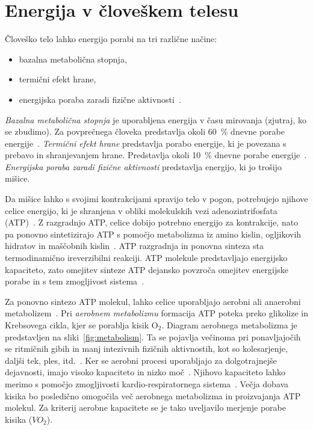 \section{Energija v človeškem telesu}\label{sec:energija}
Človeško telo lahko energijo porabi na tri različne načine:

\begin{itemize}
\item bazalna metabolična stopnja,
\item termični efekt hrane,
\item energijska poraba zaradi fizične aktivnosti~\cite{levine2005measurement}.
\end{itemize}

\emph{Bazalna metabolična stopnja} je uporabljena energija v času mirovanja (zjutraj, ko se zbudimo). Za povprečnega človeka predstavlja okoli \SI{60}{\%} dnevne porabe energije~\cite{levine2005measurement}. \emph{Termični efekt hrane} predstavlja porabo energije, ki je povezana s prebavo in shranjevanjem hrane. Predstavlja okoli \SI{10}{\%} dnevne porabe energije~\cite{levine2005measurement}. \emph{Energijska poraba zaradi fizične aktivnosti} predstavlja energijo, ki jo trošijo mišice. 

Da mišice lahko s svojimi kontrakcijami spravijo telo v pogon, potrebujejo njihove celice energijo, ki je shranjena v obliki molekulskih vezi adenozintrifosfata (ATP)~\cite{scott2005misconceptions}. Z razgradnjo ATP, celice dobijo potrebno energijo za kontrakcije, nato pa ponovno sintetizirajo ATP s pomočjo metabolizma iz amino kislin, ogljikovih hidratov in maščobnih kislin~\cite{scott2005misconceptions,patel2017aerobic}. ATP razgradnja in ponovna sinteza sta termodinamično ireverzibilni reakciji.%
ATP molekule predstavljajo energijsko kapaciteto, zato omejitev sinteze ATP dejansko povzroča omejitev energijske porabe in s tem zmogljivost sistema~\cite{sahlin1998energy}.

Za ponovno sintezo ATP molekul, lahko celice uporabljajo aerobni ali anaerobni metabolizem~\cite{scott2005misconceptions}. Pri \emph{aerobnem metabolizmu} formacija ATP poteka preko glikolize in Krebsovega cikla, kjer se porablja kisik $\mathrm{O}_2$. Diagram aerobnega metabolizma je predstavljen na sliki~\ref{fig:metabolism}. Ta se pojavlja večinoma pri ponavljajočih se ritmičnih gibih in manj intezivnih fizičnih aktivnostih, kot so kolesarjenje, daljši tek, ples, itd.~\cite{patel2017aerobic}. Ker se aerobni procesi uporabljajo za dolgotrajnejše dejavnosti, imajo visoko kapaciteto in nizko moč~\cite{sahlin1998energy}. Njihovo kapaciteto lahko merimo s pomočjo zmogljivosti kardio-respiratornega sistema~\cite{patel2017aerobic}. Večja dobava kisika bo posledično omogočila več aerobnega metabolizma in proizvajanja ATP molekul. Za kriterij aerobne kapacitete se je tako uveljavilo merjenje porabe kisika (${VO}_2$).

